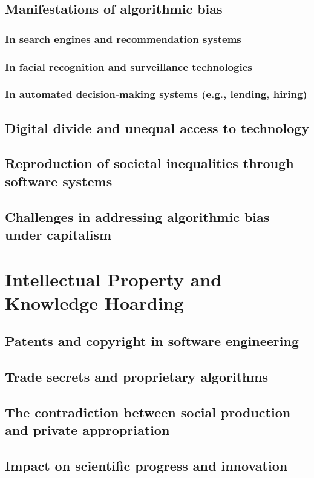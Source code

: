 \subsection{Manifestations of algorithmic bias}
\subsubsection{In search engines and recommendation systems}
\subsubsection{In facial recognition and surveillance technologies}
\subsubsection{In automated decision-making systems (e.g., lending, hiring)}
\subsection{Digital divide and unequal access to technology}
\subsection{Reproduction of societal inequalities through software systems}
\subsection{Challenges in addressing algorithmic bias under capitalism}

\newpage
\section{Intellectual Property and Knowledge Hoarding}
\subsection{Patents and copyright in software engineering}
\subsection{Trade secrets and proprietary algorithms}
\subsection{The contradiction between social production and private appropriation}
\subsection{Impact on scientific progress and innovation}

